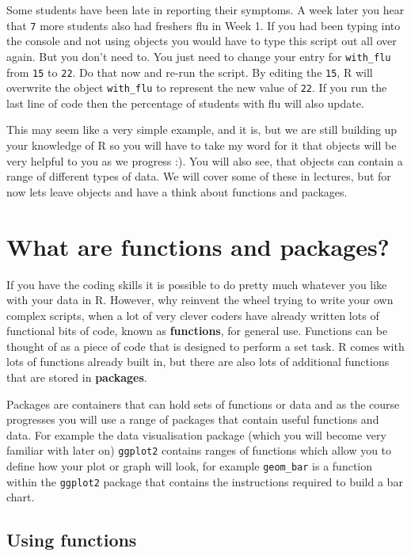 \documentclass[
]{book}
\begin{document}
Some students have been late in reporting their symptoms. A week later you hear that \texttt{7} more students also had freshers flu in Week 1. If you had been typing into the console and not using objects you would have to type this script out all over again. But you don't need to. You just need to change your entry for \texttt{with\_flu} from \texttt{15} to \texttt{22}. Do that now and re-run the script. By editing the \texttt{15}, R will overwrite the object \texttt{with\_flu} to represent the new value of \texttt{22}. If you run the last line of code then the percentage of students with flu will also update.

This may seem like a very simple example, and it is, but we are still building up your knowledge of R so you will have to take my word for it that objects will be very helpful to you as we progress :). You will also see, that objects can contain a range of different types of data. We will cover some of these in lectures, but for now lets leave objects and have a think about functions and packages.

\section{What are functions and packages?}\label{what-are-functions-and-packages}

If you have the coding skills it is possible to do pretty much whatever you like with your data in R. However, why reinvent the wheel trying to write your own complex scripts, when a lot of very clever coders have already written lots of functional bits of code, known as \textbf{functions}, for general use. Functions can be thought of as a piece of code that is designed to perform a set task. R comes with lots of functions already built in, but there are also lots of additional functions that are stored in \textbf{packages}.

Packages are containers that can hold sets of functions or data and as the course progresses you will use a range of packages that contain useful functions and data. For example the data visualisation package (which you will become very familiar with later on) \texttt{ggplot2} contains ranges of functions which allow you to define how your plot or graph will look, for example \texttt{geom\_bar} is a function within the \texttt{ggplot2} package that contains the instructions required to build a bar chart.

\subsection{Using functions}\label{using-functions}
\end{document}
